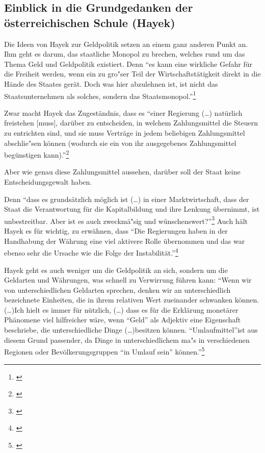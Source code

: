 \documentclass[
        onecolumn,
        a4paper,
        abstracton,
        parskip=half
        ,final
        ]{scrartcl}
\begin{document}
\subsection{Einblick in die Grundgedanken der {\"o}sterreichischen Schule (Hayek)} %

Die Ideen von Hayek zur Geldpolitik setzen an einem ganz anderen Punkt an. Ihm geht es darum, das staatliche Monopol zu brechen, welches rund um das Thema Geld und Geldpolitik existiert. Denn
"`es kann eine wirkliche Gefahr f{\"u}r die Freiheit werden, wenn ein zu gro{"s}er Teil der Wirtschaftst{\"a}tigkeit direkt in die H{\"a}nde des Staates ger{\"a}t. Doch was hier abzulehnen ist, ist nicht das Staatsunternehmen als solches, sondern das Staatsmonopol."'\footnote[411]{\citep*[S.290]{hayek1971}}

Zwar macht Hayek das Zugest{\"a}ndnis, dass es "`einer Regierung (\ldots) nat{\"u}rlich freistehen [muss], dar{\"u}ber zu entscheiden, in welchem Zahlungsmittel die Steuern zu entrichten sind, und sie muss Vertr{\"a}ge in jedem beliebigen Zahlungsmittel abschlie{"s}en k{\"o}nnen (wodurch sie ein von ihr ausgegebenes Zahlungsmittel beg{\"u}nstigen kann)."'\footnote[412]{\citep*[S.23]{Hayek1977}}

Aber wie genau diese Zahlungsmittel aussehen, dar{\"u}ber soll der Staat keine Entscheidungsgewalt haben.

Denn "`dass es grunds{\"a}tzlich m{\"o}glich ist (\ldots) in einer Marktwirtschaft, dass der Staat die Verantwortung f{\"u}r die Kapitalbildung und ihre Lenkung {\"u}bernimmt, ist unbestreitbar. Aber ist es auch zweckm{\"a}{"s}ig und w{\"u}nschenswert?"'\footnote[413]{\citep*[S.22]{Hayek1969}}
Auch h{\"a}lt Hayek es f{\"u}r wichtig, zu erw{\"a}hnen, dass "`Die Regierungen haben in der Handhabung der W{\"a}hrung eine viel aktivere Rolle {\"u}bernommen und das war ebenso sehr die Ursache wie die Folge der Instabilit{\"a}t."'\footnote[415]{ \citep*[S.409]{hayek1971}}

Hayek geht es auch weniger um die Geldpolitik an sich, sondern um die Geldarten und W{\"a}hrungen, was schnell zu Verwirrung f{\"u}hren kann: "`Wenn wir von unterschiedlichen Geldarten sprechen, denken wir an unterschiedlich bezeichnete Einheiten, die in ihrem relativen Wert zueinander schwanken k{\"o}nnen. (\ldots)Ich hielt es immer f{\"u}r n{\"u}tzlich, (\ldots) dass es f{\"u}r die Erkl{\"a}rung monet{\"a}rer Ph{\"a}nomene viel hilfreicher w{\"a}re, wenn "`Geld"' als Adjektiv eine Eigenschaft beschriebe, die unterschiedliche Dinge (\ldots)besitzen k{\"o}nnen. "`Umlaufmittel"'ist aus diesem Grund passender, da Dinge in unterschiedlichem ma{"s} in verschiedenen Regionen oder Bev{\"o}lkerungsgruppen "`in Umlauf sein"' k{\"o}nnen."'\footnote[416]{\citep*[S.40f]{Hayek1977}}
\end{document}
